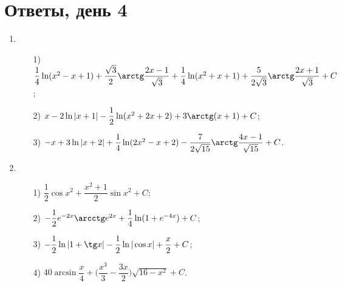 \documentclass[a4paper,12pt]{article}
\begin{document}
\section*{Ответы, день 4}

\begin{enumerate}
     	\item	
     	\begin{enumerate}
     		\item[1)] $ \dfrac{1}{4} \ln (x^2 - x + 1) + \dfrac{\sqrt{3}}{2} \arctg \dfrac{2x - 1}{\sqrt{3}} + \dfrac{1}{4} \ln (x^2 + x + 1) + \dfrac{5}{2 \sqrt{3}} \arctg \dfrac{2x + 1}{\sqrt{3}} + C$;
     		\item[2)] $ x - 2 \ln |x + 1| - \dfrac{1}{2} \ln (x^2 + 2x + 2) + 3 \arctg(x + 1) + C$;
     		\item[3)] $ -x + 3 \ln|x + 2| + \dfrac{1}{4} \ln (2x^2 - x + 2) - \dfrac{7}{2 \sqrt{15}} \arctg \dfrac{4x - 1}{\sqrt{15}} + C$.
     	\end{enumerate} 
     	
     	\item 	
     	\begin{enumerate}
     		\item[1)] $ \dfrac{1}{2} \cos x^2 + \dfrac{x^2 + 1}{2} \sin x^2 + C$;
     		\item[2)] $ -\dfrac{1}{2} e^{-2x} \arcctg e^{2x} + \dfrac{1}{4} \ln (1 + e^{-4x}) + C$;
     		\item[3)] $ - \dfrac{1}{2} \ln |1 + \tg x| - \dfrac{1}{2} \ln |\cos x| + \dfrac{x}{2} + C$;
     		\item[4)] $ 40 \arcsin \dfrac{x}{4} + \bigg( \dfrac{x^3}{3} - \dfrac{3x}{2} \bigg) \sqrt{16 - x^2} + C$.
     	\end{enumerate}
     	     	
\end{enumerate}
\end{document}
